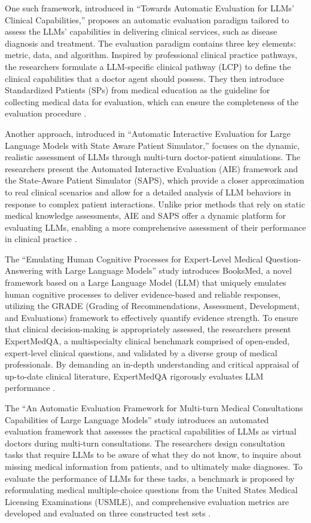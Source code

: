 \documentclass[11pt]{article}
\begin{document}
One such framework, introduced in ``Towards Automatic Evaluation for LLMs' Clinical Capabilities,'' proposes an automatic evaluation paradigm tailored to assess the LLMs' capabilities in delivering clinical services, such as disease diagnosis and treatment. The evaluation paradigm contains three key elements: metric, data, and algorithm. Inspired by professional clinical practice pathways, the researchers formulate a LLM-specific clinical pathway (LCP) to define the clinical capabilities that a doctor agent should possess. They then introduce Standardized Patients (SPs) from medical education as the guideline for collecting medical data for evaluation, which can ensure the completeness of the evaluation procedure \cite{ref87}.

Another approach, introduced in ``Automatic Interactive Evaluation for Large Language Models with State Aware Patient Simulator,'' focuses on the dynamic, realistic assessment of LLMs through multi-turn doctor-patient simulations. The researchers present the Automated Interactive Evaluation (AIE) framework and the State-Aware Patient Simulator (SAPS), which provide a closer approximation to real clinical scenarios and allow for a detailed analysis of LLM behaviors in response to complex patient interactions. Unlike prior methods that rely on static medical knowledge assessments, AIE and SAPS offer a dynamic platform for evaluating LLMs, enabling a more comprehensive assessment of their performance in clinical practice \cite{ref322}.

The ``Emulating Human Cognitive Processes for Expert-Level Medical Question-Answering with Large Language Models'' study introduces BooksMed, a novel framework based on a Large Language Model (LLM) that uniquely emulates human cognitive processes to deliver evidence-based and reliable responses, utilizing the GRADE (Grading of Recommendations, Assessment, Development, and Evaluations) framework to effectively quantify evidence strength. To ensure that clinical decision-making is appropriately assessed, the researchers present ExpertMedQA, a multispecialty clinical benchmark comprised of open-ended, expert-level clinical questions, and validated by a diverse group of medical professionals. By demanding an in-depth understanding and critical appraisal of up-to-date clinical literature, ExpertMedQA rigorously evaluates LLM performance \cite{ref82}.

The ``An Automatic Evaluation Framework for Multi-turn Medical Consultations Capabilities of Large Language Models'' study introduces an automated evaluation framework that assesses the practical capabilities of LLMs as virtual doctors during multi-turn consultations. The researchers design consultation tasks that require LLMs to be aware of what they do not know, to inquire about missing medical information from patients, and to ultimately make diagnoses. To evaluate the performance of LLMs for these tasks, a benchmark is proposed by reformulating medical multiple-choice questions from the United States Medical Licensing Examinations (USMLE), and comprehensive evaluation metrics are developed and evaluated on three constructed test sets \cite{ref323}.
\end{document}
